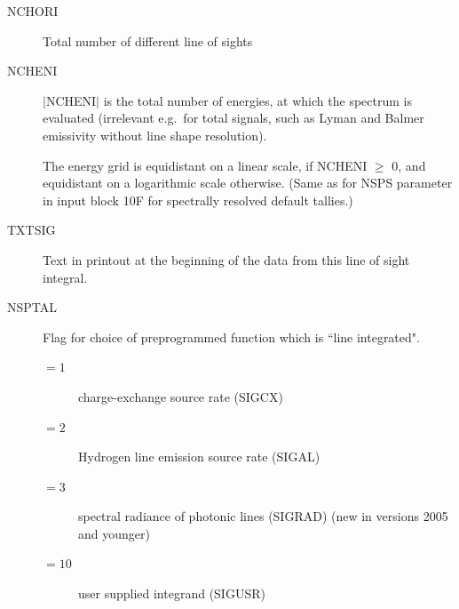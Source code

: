 \begin{description}
  \item[NCHORI] Total number of different line of sights
  \item[NCHENI] $\mid$NCHENI$\mid$ is the total number of energies, at which the
        spectrum is evaluated (irrelevant e.g.\ for total signals, such as Lyman and
        Balmer emissivity without line shape resolution).

        The energy grid is equidistant on a linear scale, if NCHENI $\ge$ 0, and
        equidistant on a logarithmic scale otherwise.
        (Same as for NSPS parameter in input block 10F for spectrally resolved default
        tallies.)
  \item[TXTSIG] Text in printout at the beginning of the data from this line of
        sight integral.
  \item[NSPTAL] Flag for choice of preprogrammed function which is ``line
        integrated".
        \begin{description}
          \item[$= 1$] charge-exchange source rate (SIGCX)
          \item[$= 2$] Hydrogen line
                emission source rate (SIGAL)
          \item[$= 3$] spectral radiance of photonic lines
                (SIGRAD) (new in versions 2005 and younger)
          \item[$= 10$] user supplied
                integrand (SIGUSR) 


\end{description}
\end{description}
